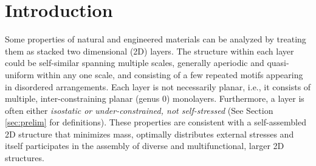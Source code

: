 \section{Introduction}
\label{sec:intro}

\newcommand{\meeraheader}[2]{\medskip\noindent\underbar{{\sl (#1) #2}}}

Some properties of natural and engineered materials can be analyzed by
treating them as stacked two dimensional (2D) layers. The structure
within each layer could be self-similar \cite{Intro1} spanning
multiple scales, generally aperiodic and quasi-uniform within any one
scale, and consisting of a few repeated motifs appearing in disordered
arrangements. Each layer is not necessarily planar, i.e., it consists
of multiple, inter-constraining planar (genus 0) monolayers.
Furthermore, a layer is often  either {\sl isostatic or
under-constrained, not self-stressed} (See Section \ref{sec:prelim} for
definitions). These properties are consistent with a self-assembled 2D
structure that minimizes mass, optimally distributes external stresses
and itself participates in the assembly of diverse and
multifunctional, larger 2D structures.

